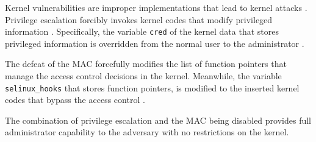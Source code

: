 Kernel vulnerabilities are improper implementations that lead to kernel
attacks \cite{chen11linux}.
Privilege escalation forcibly invokes kernel codes that modify privileged
information \cite{CVE-2016-4997,CVE-2016-9793,CVE-2017-1000112}. 
Specifically, the variable \verb|cred| of the kernel data that stores privileged
information is overridden from the normal user to the administrator
\cite{CVE-2017-16995}.

The defeat of the MAC forcefully modifies the list of function pointers that
manage the access control decisions in the kernel. Meanwhile, the variable
\verb|selinux_hooks| that stores function pointers, is modified to the inserted kernel 
codes that bypass the access control \cite{nexus5exploit,grsecurity}.

The combination of privilege escalation and the MAC being disabled provides full
administrator capability to the adversary with no restrictions on the kernel.




